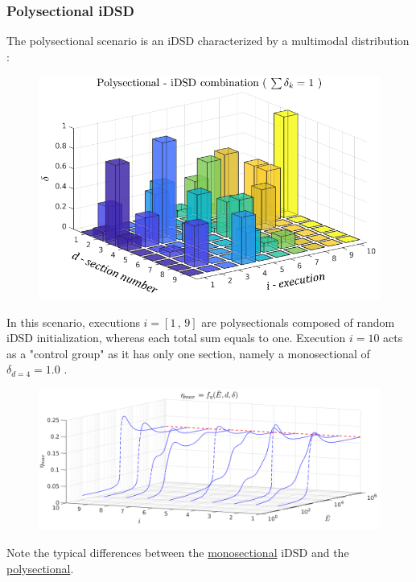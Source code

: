 \documentclass[12pt]{article}
\numberwithin{equation}{section}
\begin{document}
\begin{flushleft}
\subsubsection*{Polysectional iDSD} \label{rand_init}
The polysectional scenario is an iDSD characterized by a multimodal distribution : 
\begin{figure}[H]
\centering
\includegraphics[width=0.745\linewidth, center]{p_comb_poly.png}
\end{figure}
In this scenario, executions $i= [1 \, , \, 9]$ are polysectionals composed of random iDSD initialization, whereas each total sum equals to one. Execution $i=10$ acts as a "control group" as it has only one section, namely a monosectional of $\delta_{d=4} = 1.0$ .
\begin{figure}[H]
\centering
\includegraphics[width=1.15\linewidth, center]{p_dist_poly.png}
\end{figure}
Note the typical differences between the \underline{monosectional} iDSD and the \underline{polysectional}.


\end{flushleft}
\end{document}
